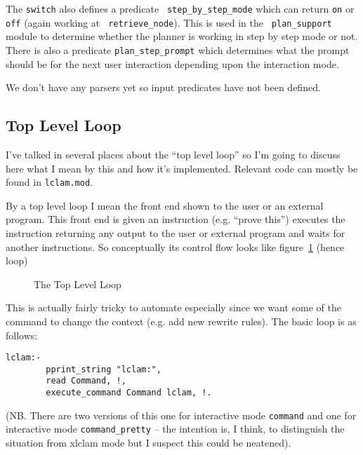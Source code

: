 The {\tt switch} also defines a predicate {\tt
  step\_by\_step\_mode} which can return
{\tt on} or {\tt off} (again working at {\tt
  retrieve\_node}).  This is used in the {\tt
  plan\_support} module to determine
whether the planner is working in step by step mode or not.  There is
also a predicate {\tt plan\_step\_prompt}
which determines what the prompt should be for the next user
interaction depending upon the interaction mode.

We don't have any parsers yet so input predicates have not been
defined.

\subsection{Top Level Loop}
\label{sec:toploop}
I've talked in several places about the ``top level loop'' so I'm
going to discuss here what I mean by this and how it's implemented.
Relevant code can mostly be found in {\tt lclam.mod}.  

By a top level loop I mean the front end shown
to the user or an 
external program.  This front end is given an instruction
(e.g. ``prove this'') executes the instruction returning any output to 
the user or external program and waits for another instructions.  So
conceptually its control flow looks like figure~\ref{fig:toploop}
(hence loop)
\begin{figure}[htb]
\begin{center}\leavevmode
{}
\end{center}
\caption{The Top Level Loop}
\label{fig:toploop}
\end{figure}
This is actually fairly tricky to automate especially since we want
some of the command to change the context (e.g. add new rewrite
rules).  The basic loop is as follows:
\begin{verbatim}
lclam:-
        pprint_string "lclam:",
        read Command, !,
        execute_command Command lclam, !.
\end{verbatim}
(NB. There are two versions of this one for interactive
mode {\tt command} and one for
interactive mode {\tt command\_pretty} -- the
intention is, I think, to distinguish the situation from
xlclam mode but I suspect this could be neatened).  


